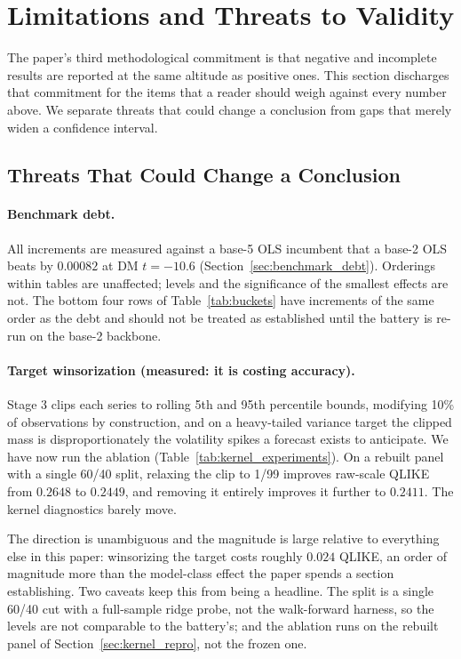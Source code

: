 \section{Limitations and Threats to Validity}
\label{sec:limitations}

The paper's third methodological commitment is that negative and incomplete
results are reported at the same altitude as positive ones. This section
discharges that commitment for the items that a reader should weigh against
every number above. We separate threats that could change a conclusion from
gaps that merely widen a confidence interval.

\subsection{Threats That Could Change a Conclusion}

\paragraph{Benchmark debt.} All increments are measured against a base-5 OLS
incumbent that a base-2 OLS beats by $0.00082$ at DM $t = -10.6$
(Section~\ref{sec:benchmark_debt}). Orderings within tables are unaffected;
levels and the significance of the smallest effects are not. The bottom four
rows of Table~\ref{tab:buckets} have increments of the same order as the debt
and should not be treated as established until the battery is re-run on the
base-2 backbone.

\paragraph{Target winsorization (measured: it is costing accuracy).} Stage 3
clips each series to rolling 5th and 95th percentile bounds, modifying 10\% of
observations by construction, and on a heavy-tailed variance target the clipped
mass is disproportionately the volatility spikes a forecast exists to
anticipate. We have now run the ablation
(Table~\ref{tab:kernel_experiments}). On a rebuilt panel with a single 60/40
split, relaxing the clip to 1/99 improves raw-scale QLIKE from $0.2648$ to
$0.2449$, and removing it entirely improves it further to $0.2411$. The kernel
diagnostics barely move.

The direction is unambiguous and the magnitude is large relative to everything
else in this paper: winsorizing the target costs roughly $0.024$ QLIKE, an
order of magnitude more than the model-class effect the paper spends a section
establishing. Two caveats keep this from being a headline. The split is a
single 60/40 cut with a full-sample ridge probe, not the walk-forward harness,
so the levels are not comparable to the battery's; and the ablation runs on the
rebuilt panel of Section~\ref{sec:kernel_repro}, not the frozen one.

